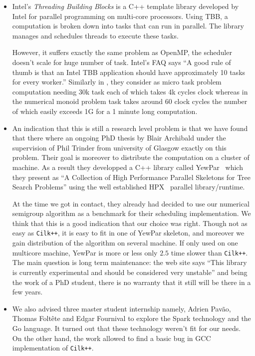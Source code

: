 \documentclass{deliverablereport}
\newcommand{\CilkP}{\texttt{Cilk++}\xspace}
\begin{document}
\begin{itemize}
  Unfortunately for the kinds of computation like numerical semigroup, there
  is a huge number of small task that are spawned. We used the implementation
  from GCC compiler. At the time of our experiment, the finding was that the
  scheduler doesn't scale to this huge number of task. The scheduling overhead
  was several order of magnitude larger than \CilkP making it unusable for
  this kinds of computations.

\item Intel's \emph{Threading Building Blocks} is a C++ template library
  developed by Intel for parallel programming on multi-core processors. Using
  TBB, a computation is broken down into tasks that can run in parallel. The
  library manages and schedules threads to execute these tasks.

  However, it suffers exactly the same problem as OpenMP, the scheduler
  doesn't scale for huge number of task. Intel's FAQ says ``A good rule of
  thumb is that an Intel TBB application should have approximately 10 tasks
  for every worker.'' Similarly in \cite{LuLi}, they consider as
  micro task problem computation needing 30k task each of which takes 4k
  cycles clock whereas in the numerical monoid problem task takes around 60
  clock cycles the number of which easily exceeds 1G for a 1 minute long
  computation.

\item An indication that this is still a research level problem is that we
  have found that there where an ongoing PhD thesis by Blair Archibald under
  the supervision of Phil Trinder from university of Glasgow exactly on this
  problem. Their goal is moreover to distribute the computation on a cluster
  of machine. As a result they developped a C++ library called
  YewPar~\cite{YewPar} which they present as ``A Collection of High
  Performance Parallel Skeletons for Tree Search Problems'' using the well
  established HPX~\cite{HPX} parallel library/runtime.

  At the time we got in contact, they already had decided to use our numerical
  semigroup algorithm as a benchmark for their scheduling implementation. We
  think that this is a good indication that our choice was right. Though not
  as easy as \CilkP, it is easy to fit in one of YewPar skeleton, and moreover
  we gain distribution of the algorithm on several machine. If only used on
  one multicore machine, YewPar is more or less only $2.5$ time slower than
  \CilkP. The main question is long term maintenance: the web site says ``This
  library is currently experimental and should be considered very unstable''
  and being the work of a PhD student, there is no warranty that it still will
  be there in a few years.

\item We also advised three master student internship namely, Adrien Pavão,
  Thomas Foltête and Edgar Fournival to explore the Spark technology and the
  Go language. It turned out that these technology weren't fit for our
  needs. On the other hand, the work allowed to find a basic bug in GCC
  implementation of \CilkP \cite{gcc-bug-80038}.
\end{itemize}
\end{document}
